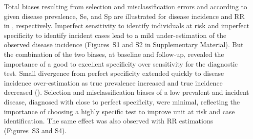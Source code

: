 Total biases resulting from selection and misclassification errors and according
to given disease prevalence, Se, and Sp are illustrated for disease incidence
and RR in , respectively.
Imperfect sensitivity to identify individuals at risk and imperfect specificity
to identify incident cases lead to a mild under-estimation of the observed
disease incidence (Figures~S1 and S2 in Supplementary Material).
But the combination of the two biases, at baseline and follow-up, revealed the
importance of a good to excellent specificity over sensitivity for the
diagnostic test.
Small divergence from perfect specificity extended quickly to disease incidence
over-estimation as true prevalence increased and true incidence decreased
().
Selection and misclassification biases of a low prevalent and incident disease,
diagnosed with close to perfect specificity, were minimal, reflecting the
importance of choosing a highly specific test to improve unit at risk and case
identification.
The same effect was also observed with RR estimations (Figures~S3 and S4).

